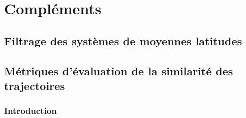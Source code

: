 \documentclass[../main.tex]{subfiles}
\begin{document}
\section{Compléments}\label{sec:complements_papier}

\subsection{Filtrage des systèmes de moyennes latitudes}\label{sec:filtrage_mid_latitudes}

\subsection{Métriques d'évaluation de la similarité des trajectoires}\label{sec:similarité}

\subsubsection*{Introduction}
\end{document}
